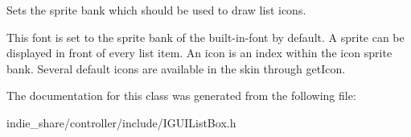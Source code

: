 Sets the sprite bank which should be used to draw list icons. 

This font is set to the sprite bank of the built-\/in-\/font by default. A sprite can be displayed in front of every list item. An icon is an index within the icon sprite bank. Several default icons are available in the skin through get\+Icon. 

The documentation for this class was generated from the following file\+:\begin{DoxyCompactItemize}
\item 
indie\+\_\+share/controller/include/I\+G\+U\+I\+List\+Box.\+h\end{DoxyCompactItemize}

